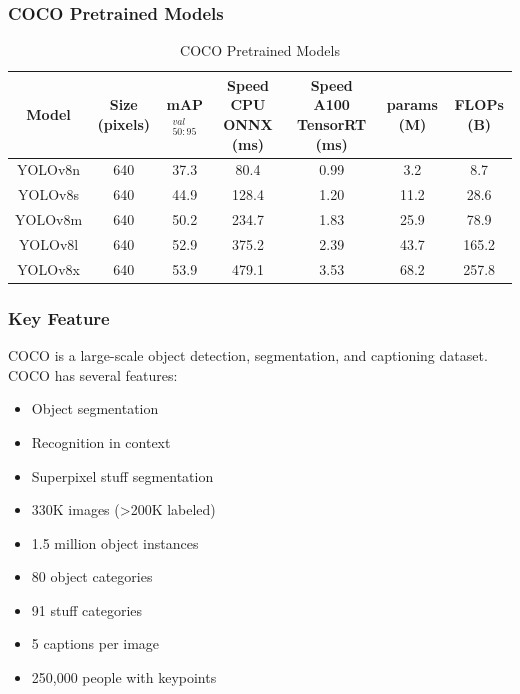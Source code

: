         \subsubsection{COCO Pretrained Models}
            \begin{table}[ht]
                \centering
                \begin{adjustbox}{width=\textwidth}
                \small
                \begin{tabular}{| c | c | c | c | c | c | c |}
                    \hline
                    \rowcolor{lightgray} Model & Size (pixels) & mAP${^{val}_{50:95}}$ & Speed CPU ONNX (ms) & Speed A100 TensorRT (ms) & params (M) & FLOPs (B) \\ \hline
                    YOLOv8n & 640 & 37.3 & 80.4 & 0.99 & 3.2 & 8.7 \\ \hline
                    YOLOv8s & 640 & 44.9 & 128.4 & 1.20 & 11.2 & 28.6 \\ \hline
                    YOLOv8m & 640 & 50.2 & 234.7 & 1.83 & 25.9 & 78.9 \\ \hline
                    YOLOv8l & 640 & 52.9 & 375.2 & 2.39 & 43.7 & 165.2 \\ \hline
                    YOLOv8x & 640 & 53.9 & 479.1 & 3.53 & 68.2 & 257.8 \\ \hline
                \end{tabular}
                \end{adjustbox}
                \caption{COCO Pretrained Models}
                \label{tab:coco-pretrained}
            \end{table}
        \subsubsection{Key Feature}
            COCO is a large-scale object detection, segmentation, and captioning dataset. COCO has several features:
            \begin{itemize}
                \item Object segmentation
                \item Recognition in context
                \item Superpixel stuff segmentation
                \item 330K images (>200K labeled)
                \item 1.5 million object instances
                \item 80 object categories
                \item 91 stuff categories
                \item 5 captions per image
                \item 250,000 people with keypoints
            \end{itemize}
